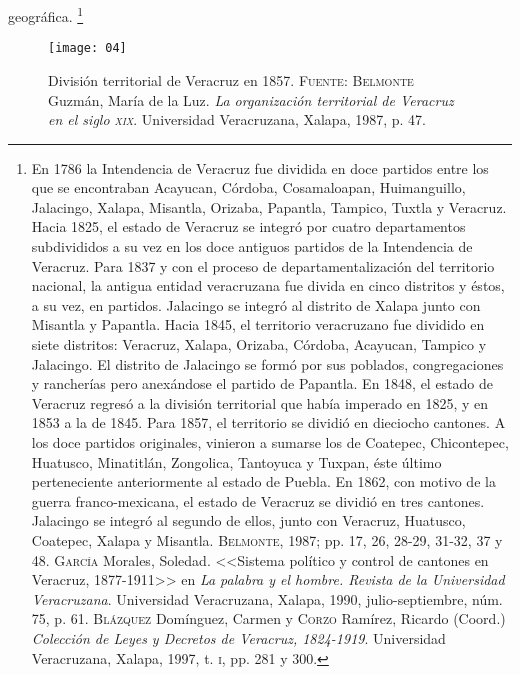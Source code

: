 \documentclass[14pt,twoside,final]{extbook} %
\let\oldfootnote\footnote
\renewcommand\footnote[1]{%
\oldfootnote{\hspace{1mm}#1}}
\begin{document}
geográfica.\footnote{En 1786 la Intendencia de Veracruz fue dividida en doce partidos entre los que se encontraban Acayucan, Córdoba, Cosamaloapan, Huimanguillo, Jalacingo, Xalapa, Misantla, Orizaba, Papantla, Tampico, Tuxtla y Veracruz. Hacia 1825, el estado de Veracruz se integró por cuatro departamentos subdivididos a su vez en los doce antiguos partidos de la Intendencia de Veracruz. Para 1837 y con el proceso de departamentalización del territorio nacional, la antigua entidad veracruzana fue divida en cinco distritos y éstos, a su vez, en partidos. Jalacingo se integró al distrito de Xalapa junto con Misantla y Papantla. Hacia 1845, el territorio veracruzano fue dividido en siete distritos: Veracruz, Xalapa, Orizaba, Córdoba, Acayucan, Tampico y Jalacingo. El distrito de Jalacingo se formó por sus poblados, congregaciones y rancherías pero anexándose el partido de Papantla. En 1848, el estado de Veracruz regresó a la división territorial que había imperado en 1825, y en 1853 a la de 1845. Para 1857, el territorio se dividió en dieciocho cantones. A los doce partidos originales, vinieron a sumarse los de Coatepec, Chicontepec, Huatusco, Minatitlán, Zongolica, Tantoyuca y Tuxpan, éste último perteneciente anteriormente al estado de Puebla. En 1862, con motivo de la guerra franco-mexicana, el estado de Veracruz se dividió en tres cantones. Jalacingo se integró al segundo de ellos, junto con Veracruz, Huatusco, Coatepec, Xalapa y Misantla. \textsc{Belmonte}, 1987; pp. 17, 26, 28-29, 31-32, 37 y 48. \textsc{García} Morales, Soledad. <<Sistema político y control de cantones en Veracruz, 1877-1911>> en \emph{La palabra y el hombre. Revista de la Universidad Veracruzana}. Universidad Veracruzana, Xalapa, 1990, julio-septiembre, núm. 75, p. 61. \textsc{Blázquez} Domínguez, Carmen y \textsc{Corzo} Ramírez, Ricardo (Coord.) \emph{Colección de Leyes y Decretos de Veracruz, 1824-1919}. Universidad Veracruzana, Xalapa, 1997, t. \textsc{i}, pp. 281 y 300.}
\begin{figure}
\texttt{[image: 04]}
\caption[División territorial de Veracruz en 1857]{División territorial de Veracruz en 1857. \textsc{Fuente}: \textsc{Belmonte} Guzmán, María de la Luz. \emph{La organización territorial de Veracruz en el siglo \textsc{xix}}. Universidad Veracruzana, Xalapa, 1987, p. 47.}
\label{fig:veracruz-1857}
\end{figure}
\end{document}

